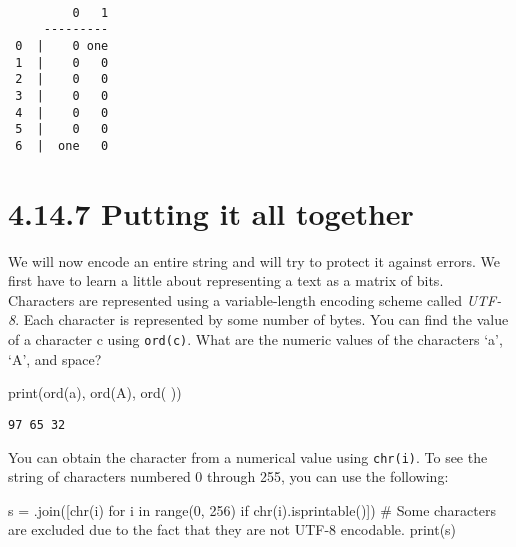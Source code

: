 \documentclass[
  letterpaper,
  DIV=11,
  numbers=noendperiod]{scrartcl}
\newenvironment{Shaded}{\begin{snugshade}}{\end{snugshade}}
\newcommand{\BuiltInTok}[1]{\textcolor[rgb]{0.00,0.23,0.31}{#1}}
\newcommand{\CommentTok}[1]{\textcolor[rgb]{0.37,0.37,0.37}{#1}}
\newcommand{\ControlFlowTok}[1]{\textcolor[rgb]{0.00,0.23,0.31}{#1}}
\newcommand{\DecValTok}[1]{\textcolor[rgb]{0.68,0.00,0.00}{#1}}
\newcommand{\KeywordTok}[1]{\textcolor[rgb]{0.00,0.23,0.31}{#1}}
\newcommand{\NormalTok}[1]{\textcolor[rgb]{0.00,0.23,0.31}{#1}}
\newcommand{\OperatorTok}[1]{\textcolor[rgb]{0.37,0.37,0.37}{#1}}
\newcommand{\StringTok}[1]{\textcolor[rgb]{0.13,0.47,0.30}{#1}}
\begin{document}
\begin{lstlisting}

         0   1
     ---------
 0  |    0 one
 1  |    0   0
 2  |    0   0
 3  |    0   0
 4  |    0   0
 5  |    0   0
 6  |  one   0
\end{lstlisting}

\newpage{}

\hypertarget{putting-it-all-together}{%
\section{4.14.7 Putting it all together}\label{putting-it-all-together}}

We will now encode an entire string and will try to protect it against
errors. We first have to learn a little about representing a text as a
matrix of bits. Characters are represented using a variable-length
encoding scheme called \emph{UTF-8}. Each character is represented by
some number of bytes. You can find the value of a character c using
\texttt{ord(c)}. What are the numeric values of the characters `a', `A',
and space?

\begin{Shaded}
\begin{Highlighting}[numbers=left,,]
\BuiltInTok{print}\NormalTok{(}\BuiltInTok{ord}\NormalTok{(}\StringTok{\textquotesingle{}a\textquotesingle{}}\NormalTok{), }\BuiltInTok{ord}\NormalTok{(}\StringTok{\textquotesingle{}A\textquotesingle{}}\NormalTok{), }\BuiltInTok{ord}\NormalTok{(}\StringTok{\textquotesingle{} \textquotesingle{}}\NormalTok{))}
\end{Highlighting}
\end{Shaded}

\begin{lstlisting}
97 65 32
\end{lstlisting}

You can obtain the character from a numerical value using
\texttt{chr(i)}. To see the string of characters numbered 0 through 255,
you can use the following:

\begin{Shaded}
\begin{Highlighting}[numbers=left,,]
\NormalTok{s }\OperatorTok{=} \StringTok{\textquotesingle{}\textquotesingle{}}\NormalTok{.join([}\BuiltInTok{chr}\NormalTok{(i) }\ControlFlowTok{for}\NormalTok{ i }\KeywordTok{in} \BuiltInTok{range}\NormalTok{(}\DecValTok{0}\NormalTok{, }\DecValTok{256}\NormalTok{) }\ControlFlowTok{if} \BuiltInTok{chr}\NormalTok{(i).isprintable()]) }\CommentTok{\# Some characters are excluded due to the fact that they are not UTF{-}8 encodable.}
\BuiltInTok{print}\NormalTok{(s)}
\end{Highlighting}
\end{Shaded}
\end{document}
